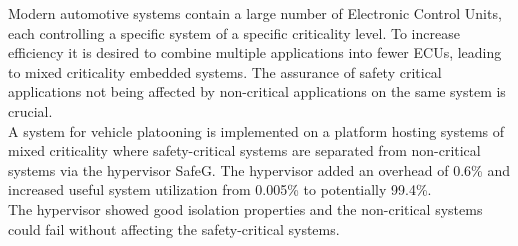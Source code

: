 Modern automotive systems contain a large number of Electronic Control Units, each controlling a specific system of a specific criticality level. To increase efficiency it is desired to combine multiple applications into fewer ECUs, leading to mixed criticality embedded systems. The assurance of safety critical applications not being affected by non-critical applications on the same system is crucial.\\

A system for vehicle platooning is implemented on a platform hosting systems of mixed criticality where safety-critical systems are separated from non-critical systems via the hypervisor SafeG. The hypervisor added an overhead of 0.6\% and increased useful system utilization from 0.005\% to potentially 99.4\%.\\

The hypervisor showed good isolation properties and the non-critical systems could fail without affecting the safety-critical systems.

\setcounter{page}{1}
\vspace{0.25cm}
